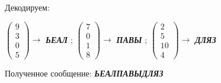 \documentclass[a5paper, 10pt]{article}
\theoremstyle{definition}
\theoremstyle{plain}
\theoremstyle{remark}
\begin{document}
Декодируем:
\begin{center}
 $ \begin{pmatrix}
9\\
3\\
0\\
5
\end{pmatrix} \to$ \textbf{\textit{ЬЕАЛ}} ;
 $ \begin{pmatrix}
7\\
0\\
1\\
8
\end{pmatrix} \to$ \textbf{\textit{ПАВЫ}} ;
 $ \begin{pmatrix}
2\\
5\\
10\\
4
\end{pmatrix} \to$ \textbf{\textit{ДЛЯЗ}} 
 \\

\end{center}
Полученное сообщение:  \textbf{\textit{ЬЕАЛПАВЫДЛЯЗ}}
\end{document}
